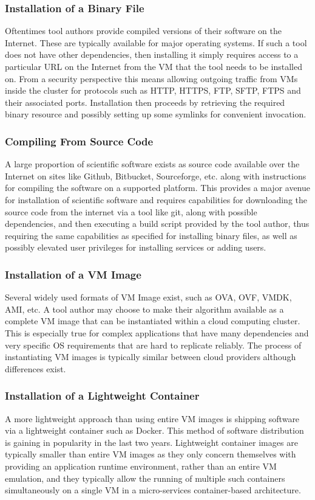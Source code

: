 \subsubsection{Installation of a Binary File}
Oftentimes tool authors provide compiled versions of their software on the Internet. These are typically available for major operating systems. If such a tool does not have other dependencies, then installing it simply requires access to a particular URL on the Internet from the VM that the tool needs to be installed on. From a security perspective this means allowing outgoing traffic from VMs inside the cluster for protocols such as HTTP, HTTPS, FTP, SFTP, FTPS and their associated ports. Installation then proceeds by retrieving the required binary resource and possibly setting up some symlinks for convenient invocation.

\subsubsection{Compiling From Source Code}
A large proportion of scientific software exists as source code available over the Internet on sites like Github, Bitbucket, Sourceforge, etc. along with instructions for compiling the software on a supported platform. This provides a major avenue for installation of scientific software and requires capabilities for downloading the source code from the internet via a tool like git, along with possible dependencies, and then executing a build script provided by the tool author, thus requiring the same capabilities as specified for installing binary files, as well as possibly elevated user privileges for installing services or adding users.

\subsubsection{Installation of a VM Image}
Several widely used formats of VM Image exist, such as OVA, OVF, VMDK, AMI, etc. A tool author may choose to make their algorithm available as a complete VM image that can be instantiated within a cloud computing cluster. This is especially true for complex applications that have many dependencies and very specific OS requirements that are hard to replicate reliably. The process of instantiating VM images is typically similar between cloud providers although differences exist.

\subsubsection{Installation of a Lightweight Container}
A more lightweight approach than using entire VM images is shipping software via a lightweight container such as Docker\autocite{merkel2014docker}. This method of software distribution is gaining in popularity in the last two years. Lightweight container images are typically smaller than entire VM images as they only concern themselves with providing an application runtime environment, rather than an entire VM emulation, and they typically allow the running of multiple such containers simultaneously on a single VM in a micro-services container-based architecture. 

